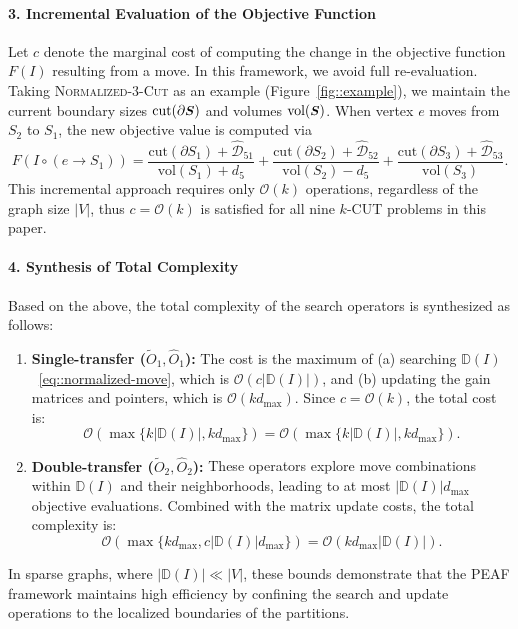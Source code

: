 \documentclass[12pt, a4paper]{article}%
\renewcommand{\vec}[1]{\mbox{\boldmath \small $#1$}}
\newcommand{\cut}{\mathrm{cut}}
\newcommand{\vol}{\mathrm{vol}}
\numberwithin{equation}{section}
\theoremstyle{plain}
\begin{document}
		\paragraph{3. Incremental Evaluation of the Objective Function}
		Let $c$ denote the marginal cost of computing the change in the objective function $F(I)$ resulting from a move. In this framework, we avoid full re-evaluation. 
		Taking \textsc{Normalized}-$3$-\textsc{Cut} as an example (Figure~\ref{fig::example}), we maintain the current boundary sizes $\text{cut}(\partial \vec{S})$ and volumes $\text{vol}(\vec{S})$. When vertex $e$ moves from $S_2$ to $S_1$, the new objective value is computed via $$F(I\circ (e\rightarrow S_1))=\frac{\cut(\partial S_1)+\widehat{\mathcal{D}}_{51}}{\vol(S_1)+d_5}+\frac{\cut(\partial S_2)+\widehat{\mathcal{D}}_{52}}{\vol(S_2)-d_5}+\frac{\cut(\partial S_3)+\widehat{\mathcal{D}}_{53}}{\vol(S_3)}.$$ This incremental approach requires only $\mathcal{O}(k)$ operations, regardless of the graph size $|V|$, thus $c = \mathcal{O}(k)$ is satisfied for all nine $k$-CUT problems in this paper.
		
		\paragraph{4. Synthesis of Total Complexity}
		Based on the above, the total complexity of the search operators is synthesized as follows:
		\begin{enumerate}
			\item \textbf{Single-transfer ($\widetilde{O}_1, \widehat{O}_1$):} The cost is the maximum of (a) searching $\mathbb{D}(I)$~\eqref{eq::normalized-move}, which is $\mathcal{O}(c|\mathbb{D}(I)|)$, and (b) updating the gain matrices and pointers, which is $\mathcal{O}(kd_{\max})$. Since $c = \mathcal{O}(k)$, the total cost is:
			$$\mathcal{O}(\max\{k|\mathbb{D}(I)|, kd_{\max}\}) = \mathcal{O}(\max\{k|\mathbb{D}(I)|, kd_{\max}\}).$$			
			\item \textbf{Double-transfer ($\widetilde{O}_2, \widehat{O}_2$):} These operators explore move combinations within $\mathbb{D}(I)$ and their neighborhoods, leading to at most $|\mathbb{D}(I)|d_{\max}$ objective evaluations. Combined with the matrix update costs, the total complexity is:
			$$\mathcal{O}(\max\{kd_{\max}, c|\mathbb{D}(I)|d_{\max}\}) = \mathcal{O}(kd_{\max}|\mathbb{D}(I)|).$$
		\end{enumerate}
	
		In sparse graphs, where $|\mathbb{D}(I)| \ll |V|$, these bounds demonstrate that the PEAF framework maintains high efficiency by confining the search and update operations to the localized boundaries of the partitions.
			
\end{document}
